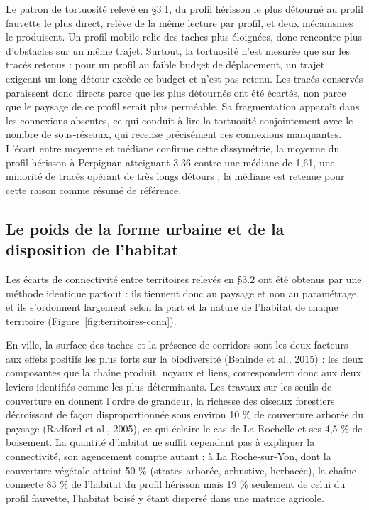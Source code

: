 \documentclass[a4paper,12pt]{report}
\begin{document}
Le patron de tortuosité relevé en §3.1, du profil hérisson le plus détourné au profil fauvette le plus direct, relève de la même lecture par profil, et deux mécanismes le produisent. Un profil mobile relie des taches plus éloignées, donc rencontre plus d'obstacles sur un même trajet. Surtout, la tortuosité n'est mesurée que sur les tracés retenus : pour un profil au faible budget de déplacement, un trajet exigeant un long détour excède ce budget et n'est pas retenu. Les tracés conservés paraissent donc directs parce que les plus détournés ont été écartés, non parce que le paysage de ce profil serait plus perméable. Sa fragmentation apparaît dans les connexions absentes, ce qui conduit à lire la tortuosité conjointement avec le nombre de sous-réseaux, qui recense précisément ces connexions manquantes. L'écart entre moyenne et médiane confirme cette dissymétrie, la moyenne du profil hérisson à Perpignan atteignant 3,36 contre une médiane de 1,61, une minorité de tracés opérant de très longs détours ; la médiane est retenue pour cette raison comme résumé de référence.

\subsection{Le poids de la forme urbaine et de la disposition de l'habitat}
Les écarts de connectivité entre territoires relevés en §3.2 ont été obtenus par une méthode identique partout : ils tiennent donc au paysage et non au paramétrage, et ils s'ordonnent largement selon la part et la nature de l'habitat de chaque territoire (Figure~\ref{fig:territoires-conn}).

En ville, la surface des taches et la présence de corridors sont les deux facteurs aux effets positifs les plus forts sur la biodiversité (Beninde et al., 2015) : les deux composantes que la chaîne produit, noyaux et liens, correspondent donc aux deux leviers identifiés comme les plus déterminants. Les travaux sur les seuils de couverture en donnent l'ordre de grandeur, la richesse des oiseaux forestiers décroissant de façon disproportionnée sous environ 10 \% de couverture arborée du paysage (Radford et al., 2005), ce qui éclaire le cas de La Rochelle et ses 4,5 \% de boisement. La quantité d'habitat ne suffit cependant pas à expliquer la connectivité, son agencement compte autant : à La Roche-sur-Yon, dont la couverture végétale atteint 50 \% (strates arborée, arbustive, herbacée), la chaîne connecte 83 \% de l'habitat du profil hérisson mais 19 \% seulement de celui du profil fauvette, l'habitat boisé y étant dispersé dans une matrice agricole.
\end{document}
